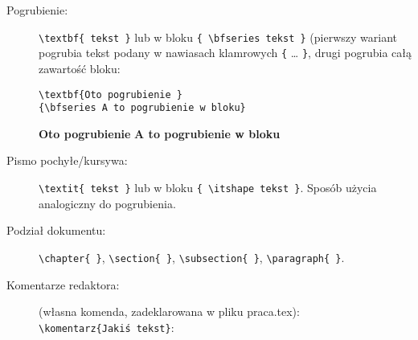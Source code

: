 \begin{description}
\item[Pogrubienie:] \verb_\textbf{ tekst }_ lub w bloku \verb_{ \bfseries tekst }_ (pierwszy wariant pogrubia tekst podany w nawiasach klamrowych \verb_{_ \ldots{} \verb_}_, drugi pogrubia całą zawartość bloku:

\begin{verbatim}
\textbf{Oto pogrubienie }
{\bfseries A to pogrubienie w bloku}
\end{verbatim}
\textbf{Oto pogrubienie }
{\bfseries A to pogrubienie w bloku}

\item[Pismo pochyłe/kursywa:] \verb_\textit{ tekst }_ lub w bloku \verb_{ \itshape tekst }_. Sposób użycia analogiczny do pogrubienia.

\item[Podział dokumentu:] \verb_\chapter{ }_, \verb_\section{ }_, \verb_\subsection{ }_, \verb_\paragraph{ }_.

\item[Komentarze redaktora:] (własna komenda, zadeklarowana w pliku praca.tex):\\\verb_\komentarz{Jakiś tekst}_: 

\end{description}
